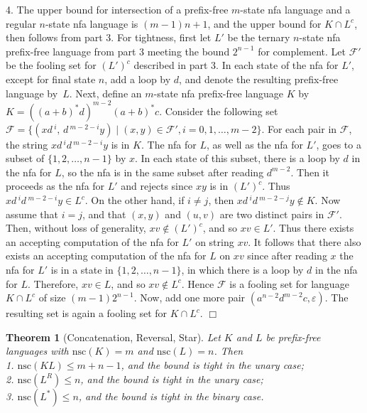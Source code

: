 \documentclass[copyright]{eptcs}
\newtheorem{theorem}{Theorem}
\newcommand{\eps}{\varepsilon}
\newcommand{\nsc}{\mathrm{nsc}}
\renewcommand{\le}{\leqslant}
\begin{document}
\label{part4}
  4. The upper bound 
  for intersection of a  prefix-free $m$-state nfa language 
  and a  regular $n$-state nfa language
  is $(m-1)n+1$, and 
  the upper bound for 
  $K\cap L^c$, then follows from part 3.
  For tightness, first let $L'$ be the ternary $n$-state nfa 
  prefix-free language from part 3 meeting the bound $2^{n-1}$ for complement.
  Let $\mathcal{F'}$ be the fooling set for $(L')^c$ described in part 3.
  In each state of the nfa for $L'$, except for final state $n$,
  add a loop by $d$, and denote the resulting prefix-free language by~$L$.
  Next, define an $m$-state nfa prefix-free language $K$
  by $K=((a+b)^*d)^{m-2}(a+b)^*c$.
  Consider the following set 
  $
     \mathcal{F}=\{ (xd\,^i,\,d\,^{m-2-i}y) \mid (x,y)\in \mathcal{F'},
                                                 i=0,1,\ldots,m-2\}.
  $
  For each pair in  $\mathcal{F}$,
  the string $xd\,^id\,^{m-2-i}y$ is in  $K$.
  The nfa for $L$, as well as the nfa for $L'$,
  goes to a subset of $\{1,2,\ldots,n-1\}$ by $x$.
  In each state of this subset, there is a loop by $d$ in the nfa for $L$,
  so the nfa is in the same subset after reading $d^{m-2}$.
  Then it proceeds as the nfa for $L'$ and rejects since $xy$ is in $(L')^c$.
  Thus  $xd\,^id\,^{m-2-i}y\in L^c$. 
  On the other hand, if $i\neq j$,
  then  $xd\,^id\,^{m-2-j}y\notin K$.
  Now assume that $i=j$, and that $(x,y)$ 
  and $(u,v)$ are two distinct pairs in $\mathcal{F'}$.
  Then, without loss of generality, $xv\notin (L')^c$, and so $xv\in L'$.
  Thus there exists an accepting computation of the nfa for $L'$ on  string $xv$.
  It follows that there also exists an accepting computation 
  of the nfa for $L$ on $xv$
  since after reading $x$ the nfa for $L'$ is in a state in $\{1,2,\ldots,n-1\}$,
  in which there is a loop by $d$ in the nfa for $L$.
  Therefore,  $xv\in L$, and so  $xv\notin L^c$.
  Hence  $\mathcal{F}$
  is a fooling set for language $K\cap L^c$ of size $(m-1)2^{n-1}$.
  Now, add one more pair  $(a^{n-2}d^{m-2}c,\eps)$.
  The resulting set is again a fooling set for $K\cap L^c$.
 \hfill$\Box$

 \begin{theorem}[Concatenation, Reversal, Star]\label{thm:con,rev,star}
  Let  $K$ and $L$
  be  prefix-free  languages  with $\nsc(K)=m$ and $\nsc(L)=n$.
  Then \\
  1. $\nsc(KL)\le m+n-1$, and the bound is tight in the unary case; \\
  2. $\nsc(L^R)\le n$, and the bound is tight in the unary case;\\
  3. $\nsc(L^*)\le n$, and the bound is tight in the binary case.
 \end{theorem}
\end{document}
